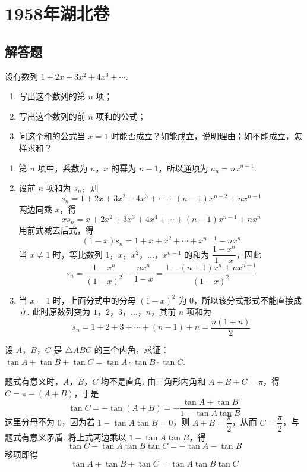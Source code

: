 \chapter{1958年湖北卷}

\section{解答题}

\begin{problem}
设有数列 \(1+2x+3x^{2}+4x^{3}+\cdots\).

\begin{enumerate}
\item 写出这个数列的第 \(n\) 项；
\item 写出这个数列的前 \(n\) 项和的公式；
\item 问这个和的公式当 \(x=1\) 时能否成立？如能成立，说明理由；如不能成立，怎样求和？
\end{enumerate}
\end{problem}

\begin{solution}
\begin{enumerate}
\item 第 \(n\) 项中，系数为 \(n\)，\(x\) 的幂为 \(n-1\)，所以通项为
\(a_n=nx^{n-1}\).

\item 设前 \(n\) 项和为 \(s_n\)，则
\[
s_n=1+2x+3x^{2}+4x^{3}+\cdots+(n-1)x^{n-2}+nx^{n-1}
\]
两边同乘 \(x\)，得
\[
xs_n=x+2x^{2}+3x^{3}+4x^{4}+\cdots+(n-1)x^{n-1}+nx^{n}
\]
用前式减去后式，得
\[
(1-x)s_n=1+x+x^{2}+\cdots+x^{n-1}-nx^{n}
\]
当 \(x\ne1\) 时，等比数列 \(1\)，\(x\)，\(x^{2}\)，\(\ldots\)，\(x^{n-1}\) 的和为 \(\dfrac{1-x^n}{1-x}\)，因此
\[
s_n=\frac{1-x^n}{(1-x)^2}-\frac{nx^n}{1-x}
    =\frac{1-(n+1)x^n+nx^{n+1}}{(1-x)^2}
\]

\item 当 \(x=1\) 时，上面分式中的分母 \((1-x)^2\) 为 \(0\)，所以该分式形式不能直接成立. 此时原数列变为 \(1\)，\(2\)，\(3\)，\(\ldots\)，\(n\)，其前 \(n\) 项和为
\[
s_n=1+2+3+\cdots+(n-1)+n
    =\frac{n(1+n)}{2}
\]
\end{enumerate}
\end{solution}

\begin{problem}
设 \(A\)，\(B\)，\(C\) 是 \(\triangle ABC\) 的三个内角，求证：\(\tan A+\tan B+\tan C=\tan A\cdot\tan B\cdot\tan C\).
\end{problem}

\begin{solution}
题式有意义时，\(A\)，\(B\)，\(C\) 均不是直角. 由三角形内角和
\(A+B+C=\pi\)，得 \(C=\pi-(A+B)\)，于是
\[
\tan C=-\tan(A+B)
       =-\frac{\tan A+\tan B}{1-\tan A\tan B}
\]
这里分母不为 \(0\)，因为若 \(1-\tan A\tan B=0\)，则 \(A+B=\dfrac{\pi}{2}\)，从而 \(C=\dfrac{\pi}{2}\)，与题式有意义矛盾. 将上式两边乘以 \(1-\tan A\tan B\)，得
\[
\tan C-\tan A\tan B\tan C=-\tan A-\tan B
\]
移项即得
\[
\tan A+\tan B+\tan C=\tan A\tan B\tan C
\]
\end{solution}


